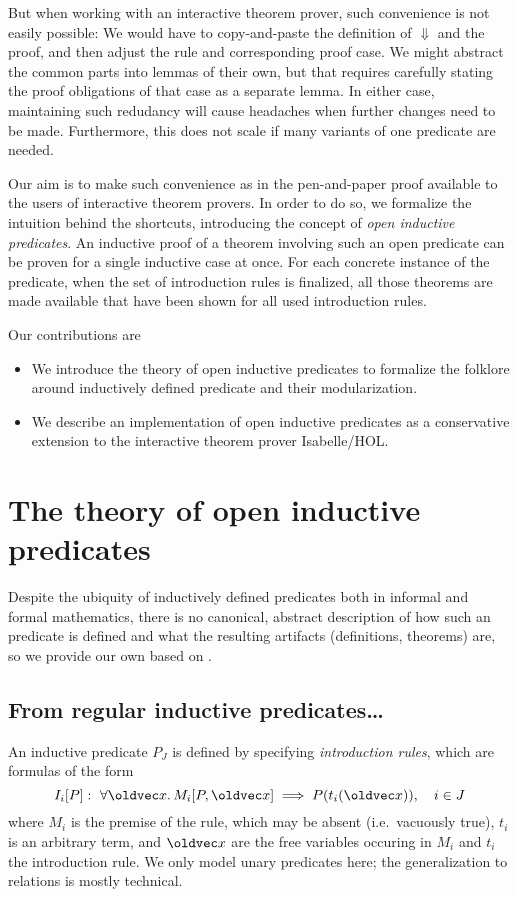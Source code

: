 \documentclass{llncs}
\let\vec\oldvec%
\newcommand{\sRule}[1]{\text{{\textsc{#1}}}}
\begin{document}
But when working with an interactive theorem prover, such convenience is not easily possible: We would have to copy-and-paste the definition of $\Downarrow$ and the proof, and then adjust the rule \sRule{Var} and corresponding proof case. We might abstract the common parts into lemmas of their own, but that requires carefully stating the proof obligations of that case as a separate lemma. In either case, maintaining such redudancy will cause headaches when further changes need to be made. Furthermore, this does not scale if many variants of one predicate are needed.

Our aim is to make such convenience as in the pen-and-paper proof available to the users of interactive theorem provers. In order to do so, we formalize the intuition behind the shortcuts, introducing the concept of \emph{open inductive predicates}. An inductive proof of a theorem involving such an open predicate can be proven for a single inductive case at once. For each concrete instance of the predicate, when the set of introduction rules is finalized, all those theorems are made available that have been shown for all used introduction rules.

\noindent Our contributions are
\begin{itemize}
\item We introduce the theory of open inductive predicates to formalize the folklore around inductively defined predicate and their modularization.
\item We describe an implementation of open inductive predicates as a conservative extension to the interactive theorem prover Isabelle/HOL.
\end{itemize}

\section{The theory of open inductive predicates}

Despite the ubiquity of inductively defined predicates both in informal and formal mathematics, there is no canonical, abstract description of how such an predicate is defined and what the resulting artifacts (definitions, theorems) are, so we provide our own based on \cite{paulson-2000}.

\subsection{From regular inductive predicates\ldots}

An inductive predicate $P_J$ is defined by specifying \emph{introduction rules}, which are formulas of the form
\[
I_i[P]:\ \forall \vec x.\,   M_i[P, \vec x] \implies P(t_i(\vec x)), \quad i \in J
\]
where $M_i$ is the premise of the rule, which may be absent (i.e.\ vacuously true), $t_i$ is an arbitrary term, and $\vec x$ are the free variables occuring in $M_i$ and $t_i$ the introduction rule. We only model unary predicates here; the generalization to relations is mostly technical.
\end{document}
